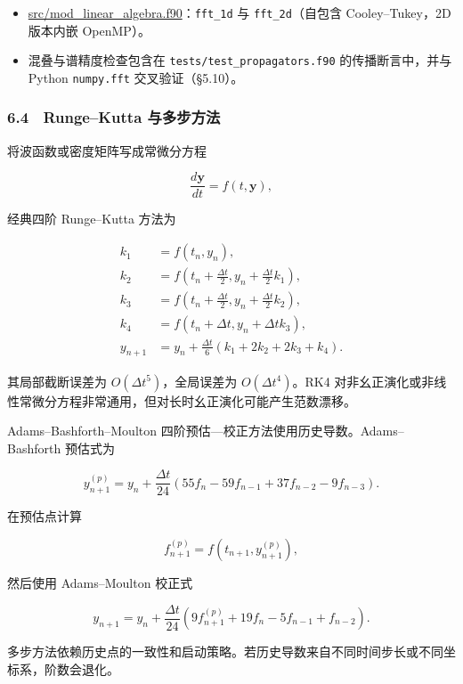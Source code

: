 \documentclass[
]{ctexbook}
\providecommand{\tightlist}{%
  \setlength{\itemsep}{0pt}\setlength{\parskip}{0pt}}
\begin{document}
\begin{itemize}
\tightlist
\item
  \href{https://github.com/l1Ha/QuantumGeneralModule/blob/main/src/mod_linear_algebra.f90}{src/mod\_linear\_algebra.f90}：\texttt{fft\_1d}
  与 \texttt{fft\_2d}（自包含 Cooley--Tukey，2D 版本内嵌 OpenMP）。
\item
  混叠与谱精度检查包含在 \texttt{tests/test\_propagators.f90}
  的传播断言中，并与 Python \texttt{numpy.fft} 交叉验证（§5.10）。
\end{itemize}

\hypertarget{rungekutta-ux4e0eux591aux6b65ux65b9ux6cd5}{%
\subsubsection{6.4　Runge--Kutta
与多步方法}\label{rungekutta-ux4e0eux591aux6b65ux65b9ux6cd5}}

将波函数或密度矩阵写成常微分方程

\[
\frac{d\mathbf{y}}{dt}=f(t,\mathbf{y}),
\]

经典四阶 Runge--Kutta 方法为

\[
\begin{aligned}
k_1&=f(t_n,y_n),\\
k_2&=f\left(t_n+\frac{\Delta t}{2},y_n+\frac{\Delta t}{2}k_1\right),\\
k_3&=f\left(t_n+\frac{\Delta t}{2},y_n+\frac{\Delta t}{2}k_2\right),\\
k_4&=f(t_n+\Delta t,y_n+\Delta t k_3),\\
y_{n+1}
&=
y_n+
\frac{\Delta t}{6}
(k_1+2k_2+2k_3+k_4).
\end{aligned}
\]

其局部截断误差为 \(O(\Delta t^5)\)，全局误差为 \(O(\Delta t^4)\)。RK4
对非幺正演化或非线性常微分方程非常通用，但对长时幺正演化可能产生范数漂移。

Adams--Bashforth--Moulton
四阶预估---校正方法使用历史导数。Adams--Bashforth 预估式为

\[
y_{n+1}^{(p)}
=
y_n
+
\frac{\Delta t}{24}
(55f_n-59f_{n-1}+37f_{n-2}-9f_{n-3}).
\]

在预估点计算

\[
f_{n+1}^{(p)}
=
f(t_{n+1},y_{n+1}^{(p)}),
\]

然后使用 Adams--Moulton 校正式

\[
y_{n+1}
=
y_n
+
\frac{\Delta t}{24}
(9f_{n+1}^{(p)}+19f_n-5f_{n-1}+f_{n-2}).
\]

多步方法依赖历史点的一致性和启动策略。若历史导数来自不同时间步长或不同坐标系，阶数会退化。
\end{document}
